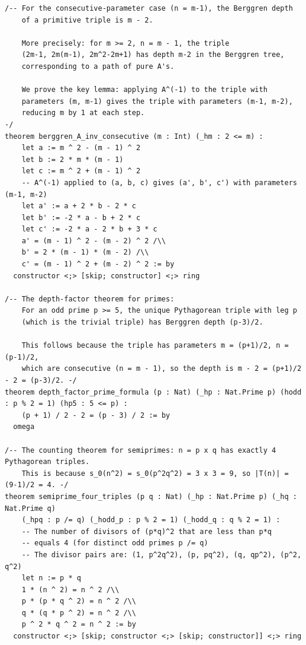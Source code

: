 \documentclass[11pt,openright,twoside]{book}
\theoremstyle{definition}
\begin{document}
\begin{lstlisting}[style=lean]
/-- For the consecutive-parameter case (n = m-1), the Berggren depth
    of a primitive triple is m - 2.

    More precisely: for m >= 2, n = m - 1, the triple
    (2m-1, 2m(m-1), 2m^2-2m+1) has depth m-2 in the Berggren tree,
    corresponding to a path of pure A's.

    We prove the key lemma: applying A^(-1) to the triple with
    parameters (m, m-1) gives the triple with parameters (m-1, m-2),
    reducing m by 1 at each step.
-/
theorem berggren_A_inv_consecutive (m : Int) (_hm : 2 <= m) :
    let a := m ^ 2 - (m - 1) ^ 2
    let b := 2 * m * (m - 1)
    let c := m ^ 2 + (m - 1) ^ 2
    -- A^(-1) applied to (a, b, c) gives (a', b', c') with parameters (m-1, m-2)
    let a' := a + 2 * b - 2 * c
    let b' := -2 * a - b + 2 * c
    let c' := -2 * a - 2 * b + 3 * c
    a' = (m - 1) ^ 2 - (m - 2) ^ 2 /\\
    b' = 2 * (m - 1) * (m - 2) /\\
    c' = (m - 1) ^ 2 + (m - 2) ^ 2 := by
  constructor <;> [skip; constructor] <;> ring

/-- The depth-factor theorem for primes:
    For an odd prime p >= 5, the unique Pythagorean triple with leg p
    (which is the trivial triple) has Berggren depth (p-3)/2.

    This follows because the triple has parameters m = (p+1)/2, n = (p-1)/2,
    which are consecutive (n = m - 1), so the depth is m - 2 = (p+1)/2 - 2 = (p-3)/2. -/
theorem depth_factor_prime_formula (p : Nat) (_hp : Nat.Prime p) (hodd : p % 2 = 1) (hp5 : 5 <= p) :
    (p + 1) / 2 - 2 = (p - 3) / 2 := by
  omega

/-- The counting theorem for semiprimes: n = p x q has exactly 4 Pythagorean triples.
    This is because s_0(n^2) = s_0(p^2q^2) = 3 x 3 = 9, so |T(n)| = (9-1)/2 = 4. -/
theorem semiprime_four_triples (p q : Nat) (_hp : Nat.Prime p) (_hq : Nat.Prime q)
    (_hpq : p /= q) (_hodd_p : p % 2 = 1) (_hodd_q : q % 2 = 1) :
    -- The number of divisors of (p*q)^2 that are less than p*q
    -- equals 4 (for distinct odd primes p /= q)
    -- The divisor pairs are: (1, p^2q^2), (p, pq^2), (q, qp^2), (p^2, q^2)
    let n := p * q
    1 * (n ^ 2) = n ^ 2 /\\
    p * (p * q ^ 2) = n ^ 2 /\\
    q * (q * p ^ 2) = n ^ 2 /\\
    p ^ 2 * q ^ 2 = n ^ 2 := by
  constructor <;> [skip; constructor <;> [skip; constructor]] <;> ring

\end{lstlisting}

\clearpage


\printindex
\end{document}
